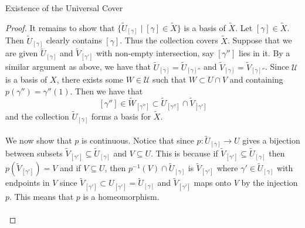\documentclass[a4paper]{article}
\begin{document}
\begin{thm}{Existence of the Universal Cover}{}
\begin{proof}
It remains to show that $\{\tilde{U}_{[\gamma]}\;|\;[\gamma]\in\tilde{X}\}$ is a basis of $\tilde{X}$. Let $[\gamma]\in\tilde{X}$. Then $\tilde{U}_{[\gamma]}$ clearly contains $[\gamma]$. Thus the collection covers $\tilde{X}$. Suppose that we are given $\tilde{U}_{[\gamma]}$ and $\tilde{V}_{[\gamma']}$ with non-empty intersection, say $[\gamma'']$ lies in it. By a similar argument as above, we have that $\tilde{U}_{[\gamma]}=\tilde{U}_{[\gamma]''}$ and $\tilde{V}_{[\gamma]}=\tilde{V}_{[\gamma]''}$. Since $\mathcal{U}$ is a basis of $X$, there exists some $W\in\mathcal{U}$ such that $W\subset U\cap V$ and containing $p(\gamma'')=\gamma''(1)$. Then we have that $$[\gamma'']\in\tilde{W}_{[\gamma'']}\subset\tilde{U}_{[\gamma'']}\cap\tilde{V}_{[\gamma']}$$ and the collection $\tilde{U}_{[\gamma]}$ forms a basis for $\tilde{X}$. \\~\\

We now show that $p$ is continuous. Notice that since $p:\tilde{U}_{[\gamma]}\to U$ gives a bijection between subsets $\tilde{V}_{[\gamma']}\subseteq\tilde{U}_{[\gamma]}$ and $V\subseteq U$. This is because if $\tilde{V}_{[\gamma']}\subseteq\tilde{U}_{[\gamma]}$ then $p\left(\tilde{V}_{[\gamma']}\right)=V$ and if $V\subseteq U$, then $p^{-1}(V)\cap\tilde{U}_{[\gamma]}$ is $\tilde{V}_{[\gamma']}$ where $\gamma'\in\tilde{U}_{[\gamma]}$ with endpoints in $V$ since $\tilde{V}_{[\gamma']}\subset U_{[\gamma']}=\tilde{U}_{[\gamma]}$ and $\tilde{V}_{[\gamma']}$ maps onto $V$ by the injection $p$. This means that $p$ is a homeomorphism. \\~\\


\end{proof}
\end{thm}
\end{document}
